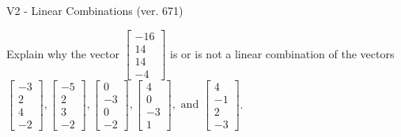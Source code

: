 \begin{exercise}
  \begin{exerciseTitle}V2 - Linear Combinations (ver. 671)\end{exerciseTitle}
  \begin{exerciseStatement}
    Explain why the vector \(\left[\begin{array}{c}
-16 \\
14 \\
14 \\
-4
\end{array}\right]\)  is or is not a linear 
	combination of the vectors \(\left[\begin{array}{c}
-3 \\
2 \\
4 \\
-2
\end{array}\right] , \left[\begin{array}{c}
-5 \\
2 \\
3 \\
-2
\end{array}\right] , \left[\begin{array}{c}
0 \\
-3 \\
0 \\
-2
\end{array}\right] , \left[\begin{array}{c}
4 \\
0 \\
-3 \\
1
\end{array}\right] , \text{ and } \left[\begin{array}{c}
4 \\
-1 \\
2 \\
-3
\end{array}\right]\).
	



\end{exerciseStatement}
\end{exercise}
